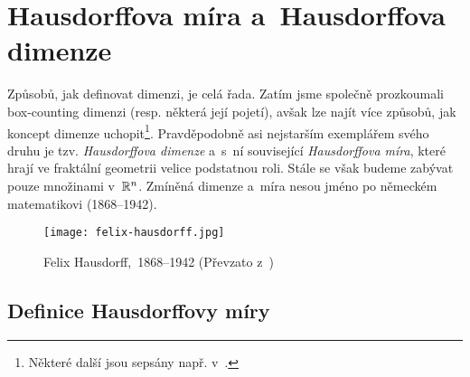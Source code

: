 \section{Hausdorffova míra a~Hausdorffova dimenze}\label{sec:hausdorffova-mira-dimenze}

Způsobů, jak definovat dimenzi, je celá řada. Zatím jsme společně prozkoumali box-counting dimenzi (resp. některá její pojetí), avšak lze najít více způsobů, jak koncept dimenze uchopit\footnote{Některé další jsou sepsány např. v~\citep[str. 40]{Falconer2014}.}. Pravděpodobně asi nejstarším exemplářem svého druhu je tzv. \emph{Hausdorffova dimenze} a~s~ní související \emph{Hausdorffova míra}, které hrají ve fraktální geometrii velice podstatnou roli. Stále se však budeme zabývat pouze množinami v~$\mathbb{R}^n$. Zmíněná dimenze a~míra nesou jméno po německém matematikovi  (1868--1942).
\begin{figure}[h]
    \centering
    \texttt{[image: felix-hausdorff.jpg]}
    \caption[Felix Hausdorff,~1868--1942]{Felix Hausdorff,~1868--1942 (Převzato z~\cite{OConnorHausdorff2025})}
    \label{fig:felix-hausdorff}
\end{figure}

\subsection{Definice Hausdorffovy míry}\label{subsec:hd-mira-definice}

